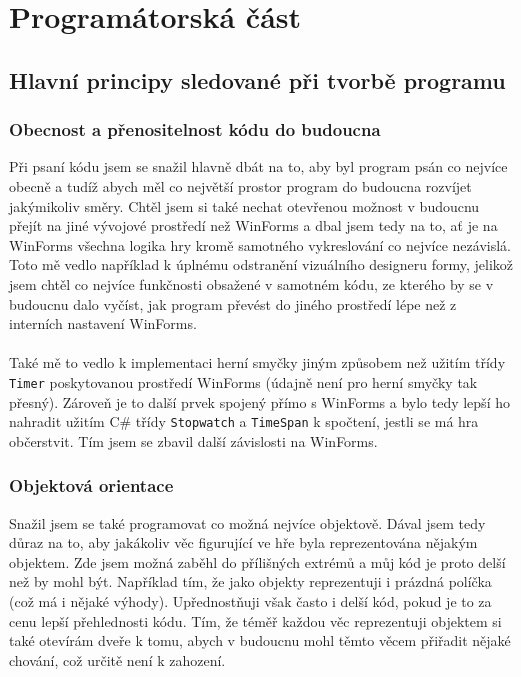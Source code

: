 \documentclass[a4]{article}
\begin{document}
\section{Programátorská část}
\subsection{Hlavní principy sledované při tvorbě programu}
\subsubsection{Obecnost a přenositelnost kódu do budoucna}
Při psaní kódu jsem se snažil hlavně dbát na to, aby byl program psán co nejvíce obecně a tudíž abych měl co největší prostor program do budoucna rozvíjet jakýmikoliv směry. Chtěl jsem si také nechat otevřenou možnost v budoucnu přejít na jiné vývojové prostředí než WinForms a dbal jsem tedy na to, ať je na WinForms všechna logika hry kromě samotného vykreslování co nejvíce nezávislá. Toto mě vedlo například k úplnému odstranění vizuálního designeru formy, jelikož jsem chtěl co nejvíce funkčnosti obsažené v samotném kódu, ze kterého by se v budoucnu dalo vyčíst, jak program převést do jiného prostředí lépe než z interních nastavení WinForms.
\\\\
Také mě to vedlo k implementaci herní smyčky jiným způsobem než užitím třídy \verb|Timer| poskytovanou prostředí WinForms (údajně není pro herní smyčky tak přesný). Zároveň je to další prvek spojený přímo s WinForms a bylo tedy lepší ho nahradit užitím C\# třídy \verb|Stopwatch| a \verb|TimeSpan| k spočtení, jestli se má hra občerstvit. Tím jsem se zbavil další závislosti na WinForms.
\subsubsection{Objektová orientace}
Snažil jsem se také programovat co možná nejvíce objektově. Dával jsem tedy důraz na to, aby jakákoliv věc figurující ve hře byla reprezentována nějakým objektem. Zde jsem možná zaběhl do přílišných extrémů a můj kód je proto delší než by mohl být. Například tím, že jako objekty reprezentuji i prázdná políčka (což má i nějaké výhody). Upřednostňuji však často i delší kód, pokud je to za cenu lepší přehlednosti kódu. Tím, že téměř každou věc reprezentuji objektem si také otevírám dveře k tomu, abych v budoucnu mohl těmto věcem přiřadit nějaké chování, což určitě není k zahození.
\end{document}
